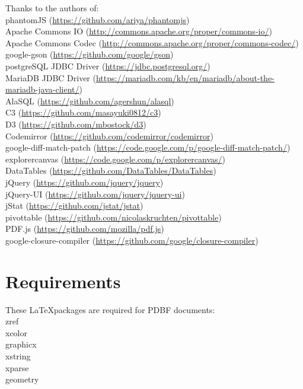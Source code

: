\documentclass[11pt]{scrartcl}
\begin{document}
\newpage
\noindent Thanks to the authors of:\\
phantomJS (\url{https://github.com/ariya/phantomjs})\\
Apache Commons IO (\url{http://commons.apache.org/proper/commons-io/})\\
Apache Commons Codec (\url{http://commons.apache.org/proper/commons-codec/})\\
google-gson (\url{https://github.com/google/gson})\\
postgreSQL JDBC Driver (\url{https://jdbc.postgresql.org/})\\
MariaDB JDBC Driver (\url{https://mariadb.com/kb/en/mariadb/about-the-mariadb-java-client/})\\
AlaSQL (\url{https://github.com/agershun/alasql})\\
C3 (\url{https://github.com/masayuki0812/c3})\\
D3 (\url{https://github.com/mbostock/d3})\\
Codemirror (\url{https://github.com/codemirror/codemirror})\\
google-diff-match-patch (\url{https://code.google.com/p/google-diff-match-patch/})\\
explorercanvas (\url{https://code.google.com/p/explorercanvas/})\\
DataTables (\url{https://github.com/DataTables/DataTables})\\
jQuery (\url{https://github.com/jquery/jquery})\\
jQuery-UI (\url{https://github.com/jquery/jquery-ui})\\
jStat (\url{https://github.com/jstat/jstat})\\
pivottable (\url{https://github.com/nicolaskruchten/pivottable})\\
PDF.js (\url{https://github.com/mozilla/pdf.js})\\
google-closure-compiler (\url{https://github.com/google/closure-compiler})\\
\newpage
\tableofcontents
\newpage

\section{Requirements}
These \LaTeX\relax packages are required for PDBF documents:\\
zref\\
xcolor\\
graphicx\\
xstring\\
xparse\\
geometry\\
\end{document}
